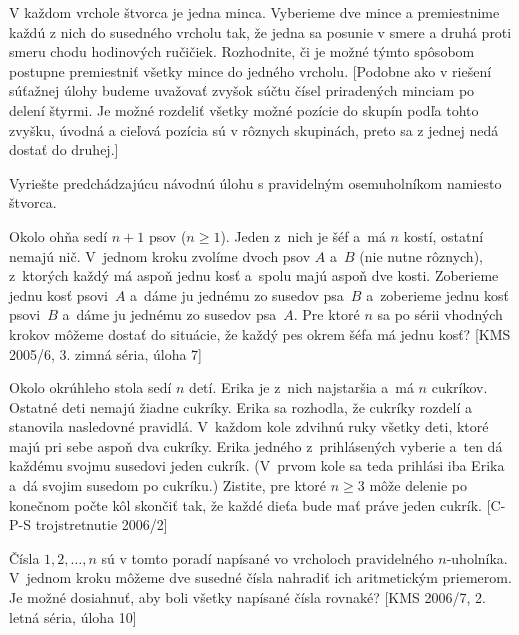 {V každom vrchole štvorca je jedna minca. Vyberieme dve mince a premiestnime každú z nich do susedného vrcholu tak, že jedna sa posunie v smere a druhá proti smeru chodu hodinových ručičiek. Rozhodnite, či je možné týmto spôsobom postupne premiestniť všetky mince do jedného vrcholu. [Podobne ako v riešení súťažnej úlohy budeme uvažovať zvyšok súčtu čísel priradených minciam po delení štyrmi. Je možné rozdeliť všetky možné pozície do skupín podľa tohto zvyšku, úvodná a cieľová pozícia sú v rôznych skupinách, preto sa z jednej nedá dostať do druhej.]

Vyriešte predchádzajúcu návodnú úlohu s pravidelným osemuholníkom namiesto štvorca.

\D
Okolo ohňa sedí $n+1$ psov ($n\ge 1$). Jeden z~nich je šéf a~má $n$ kostí, ostatní nemajú nič. V~jednom kroku zvolíme dvoch psov $A$ a~$B$ (nie nutne rôznych), z~ktorých každý má aspoň jednu kosť a~spolu majú aspoň dve kosti. Zoberieme jednu kosť psovi~$A$ a~dáme ju jednému zo susedov psa~$B$ a~zoberieme jednu kosť psovi~$B$ a~dáme ju jednému zo susedov psa~$A$. Pre ktoré $n$ sa po sérii vhodných krokov môžeme dostať do situácie, že každý pes okrem šéfa má jednu kosť?
[KMS 2005/6, 3. zimná séria, úloha 7]

Okolo okrúhleho stola sedí $n$ detí. Erika je z~nich najstaršia a~má $n$ cukríkov. Ostatné deti nemajú žiadne cukríky. Erika sa rozhodla, že cukríky rozdelí a stanovila nasledovné pravidlá. V~každom kole zdvihnú ruky všetky deti, ktoré majú pri sebe aspoň dva cukríky. Erika jedného z~prihlásených vyberie a~ten dá každému svojmu susedovi jeden cukrík. (V~prvom kole sa teda prihlási iba Erika a~dá svojim susedom po cukríku.) Zistite, pre ktoré $n\ge 3$ môže delenie po konečnom počte kôl skončiť tak, že každé dieťa bude mať práve jeden cukrík.
[C-P-S trojstretnutie 2006/2]

Čísla $1, 2, \dots, n$ sú v tomto poradí napísané vo vrcholoch pravidelného $n$-uholníka. V~jednom kroku môžeme dve susedné čísla nahradiť ich aritmetickým priemerom. Je možné dosiahnuť, aby boli všetky napísané čísla rovnaké?
[KMS 2006/7, 2. letná séria, úloha 10]
}

